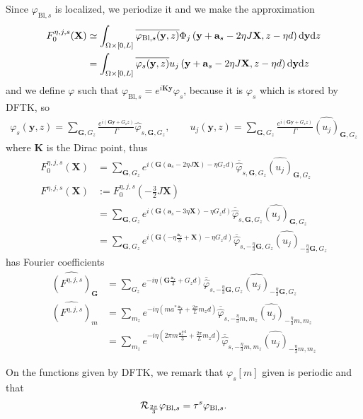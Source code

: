 \documentclass[11pt,a4paper,reqno,french,tikz]{amsart}
\def\d{{\rm d}}
\newcommand{\pa}[1]{\left( #1 \right)} %
\newcommand\vp{\varphi} %
\newcommand{\f}[2]{\frac{#1}{#2}} %
\def\bX{{\mathbf X}}
\def\bG{{\mathbf G}}
\def\ba{{\mathbf a}}
\def\by{{\mathbf y}}
\def\bK{{\mathbf K}}
\begin{document}
Since $\vp_{\text{Bl},s}$ is localized, we periodize it and we make the approximation
\begin{align*}
	F_0^{\eta,j,s}(\bX) &\simeq \int_{\Omega \times [0,L]} \overline{\vp_{\text{Bl},s}(\by,z)} \Phi_j\pa{\by +\ba_s -2\eta J \bX,z-\eta d} \d \by \d z \\
&=\int_{\Omega \times [0,L]} \overline{\vp_{s}(\by,z)} u_j\pa{\by +\ba_s -2\eta J \bX,z-\eta d} \d \by \d z
\end{align*}
and we define $\vp$ such that $\vp_{\text{Bl},s} = e^{i \bK \by} \vp_s$, because it is $\widehat{\vp_s}$ which is stored by DFTK, so
\begin{align*}
\vp_{s}(\by,z) = \sum_{\bG, G_z} \f{e^{i\pa{\bG \by + G_z z}}}{\Gamma} \widehat{\vp}_{s,\bG,G_z}, \qquad u_j(\by,z) = \sum_{\bG, G_z} \f{e^{i\pa{\bG \by + G_z z}}}{\Gamma} \widehat{\pa{u_j}}_{\bG,G_z}
\end{align*}
where $\bK$ is the Dirac point, thus
\begin{align*}
F_0^{\eta,j,s}(\bX) &=  \sum_{\bG, G_z} e^{i\pa{\bG \pa{\ba_s - 2\eta J \bX} - \eta G_z d}} \overline{\widehat{\vp}}_{s,\bG,G_z} \widehat{\pa{u_j}}_{\bG,G_z} \\
F^{\eta,j,s}\pa{\bX} & := F_0^{\eta,j,s}\pa{-\tfrac{3}{2} J\bX} \\
		     &=  \sum_{\bG, G_z} e^{i\pa{\bG \pa{\ba_s - 3\eta \bX} - \eta G_z d}} \overline{\widehat{\vp}}_{s,\bG,G_z}\widehat{\pa{u_j}}_{\bG,G_z}\\
&=  \sum_{\bG, G_z} e^{i\pa{\bG \pa{-\eta \f{\ba_s}3 + \bX} - \eta G_z d}} \overline{\widehat{\vp}}_{s,-\f{\eta}{3}\bG,G_z} \widehat{\pa{u_j}}_{-\f{\eta}{3} \bG,G_z}
\end{align*}
has Fourier coefficients
\begin{align*}
	\widehat{\pa{F^{\eta,j,s}}}_{\bG} &=  \sum_{G_z} e^{-i \eta \pa{\bG  \f{\ba_s}3 + G_z d}} \overline{\widehat{\vp}}_{s,-\f{\eta}{3}\bG,G_z} \widehat{\pa{u_j}}_{-\f{\eta}{3} \bG,G_z} \\
	\widehat{\pa{F^{\eta,j,s}}}_{m}& =  \sum_{m_z} e^{-i \eta \pa{ma^*  \f{\ba_s}3 + \f{2\pi}{L} m_z d}} \overline{\widehat{\vp}}_{s,-\f{\eta}{3}m,m_z} \widehat{\pa{u_j}}_{-\f{\eta}{3} m,m_z} \\
& =  \sum_{m_z} e^{-i \eta \pa{2\pi m \f{\ba^{\text{red}}_s}3 + \f{2\pi}{L} m_z d}} \overline{\widehat{\vp}}_{s,-\f{\eta}{3}m,m_z} \widehat{\pa{u_j}}_{-\f{\eta}{3} m,m_z}
\end{align*}

On the functions given by DFTK, we remark that $\vp_s[m]$ given is periodic and that 
\begin{align*}
\cR_{\f{2\pi}{3}} \vp_{\text{Bl},s} = \tau^s \vp_{\text{Bl},s}.
\end{align*}
\end{document}
